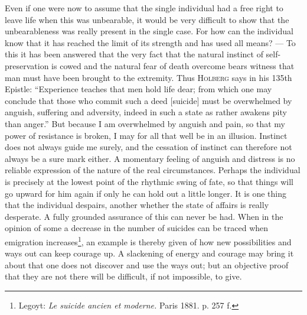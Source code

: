 \documentclass[12pt,a4paper,openany]{book}
\newcommand{\opage}[1]{\marginnote{\footnotesize\textit{[#1]}}}
\begin{document}
Even if one were now to assume that the single individual had a free right to leave life when this was
unbearable, it would
\opage{215}be very difficult to show that the unbearableness was really present in the single case. For how can the
individual know that it has reached the limit of its strength and has used all means? --- To this it has been
answered that the very fact that the natural instinct of self-preservation is cowed and the natural fear of death
overcome bears witness that man must have been brought to the extremity. Thus \textsc{Holberg} says in his 135th
Epistle: ``Experience teaches that men hold life dear; from which one may conclude that those who commit such a
deed [suicide] must be overwhelmed by anguish, suffering and adversity, indeed in such a state as rather awakens
pity than anger.'' But because I am overwhelmed by anguish and pain, so that my power of resistance is broken, I
may for all that well be in an illusion. Instinct does not always guide me surely, and the cessation of instinct
can therefore not always be a sure mark either. A momentary feeling of anguish and distress is no reliable
expression of the nature of the real circumstances. Perhaps the individual is precisely at the lowest point of the
rhythmic swing of fate, so that things will go upward for him again if only he can hold out a little longer. It is
one thing that the individual despairs, another whether the state of affairs is really desperate. A fully grounded
assurance of this can never be had. When in the opinion of some a decrease in the number of suicides can be traced
when emigration increases\footnote[1]{Legoyt: \textit{Le suicide ancien et moderne.} Paris 1881. p. 257
f.}, an example is thereby given of how new possibilities and ways out can keep courage up. A slackening of energy
and courage may bring it about that one does not discover and use the ways out; but an objective proof that they
are not there will be difficult, if not impossible, to give.
\end{document}
